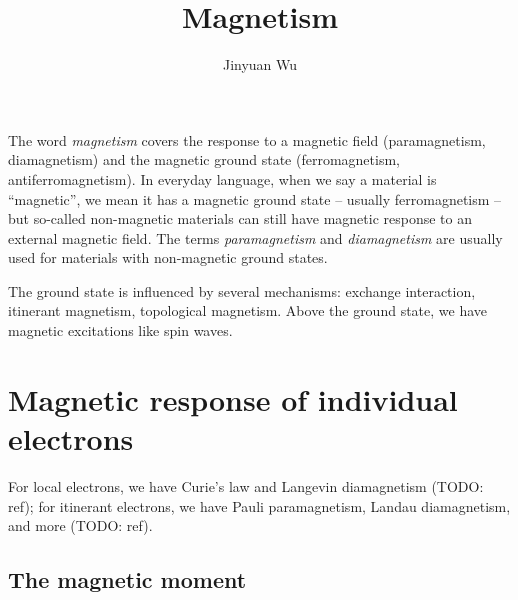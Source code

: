 \documentclass[hyperref, a4paper]{article}
\title{Magnetism}
\author{Jinyuan Wu}
\newcommand*{\term}[1]{\textit{#1}}
\begin{document}
\maketitle

The word \term{magnetism} covers the response to a magnetic field 
(paramagnetism, diamagnetism)
and the magnetic ground state 
(ferromagnetism, antiferromagnetism).
In everyday language,
when we say a material is ``magnetic'',
we mean it has a magnetic ground state -- usually ferromagnetism -- 
but so-called non-magnetic materials 
can still have magnetic response 
to an external magnetic field.
The terms \term{paramagnetism} and \term{diamagnetism} 
are usually used for materials with non-magnetic ground states.

The ground state is influenced by several mechanisms:
exchange interaction, 
itinerant magnetism,
topological magnetism.
Above the ground state, we have magnetic excitations like spin waves.

\section{Magnetic response of individual electrons}

For local electrons, 
we have Curie's law and Langevin diamagnetism (TODO: ref);
for itinerant electrons,
we have Pauli paramagnetism,
Landau diamagnetism, and more (TODO: ref). 

\subsection{The magnetic moment}
\end{document}
